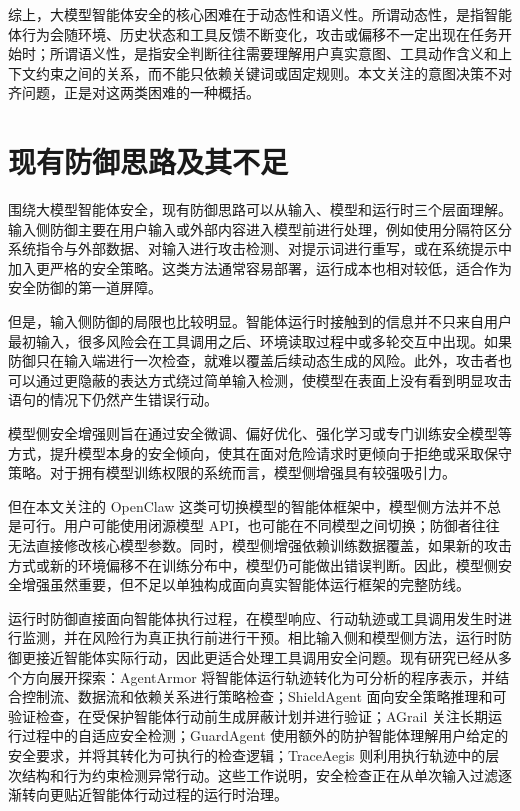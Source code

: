 综上，大模型智能体安全的核心困难在于动态性和语义性。所谓动态性，是指智能体行为会随环境、历史状态和工具反馈不断变化，攻击或偏移不一定出现在任务开始时；所谓语义性，是指安全判断往往需要理解用户真实意图、工具动作含义和上下文约束之间的关系，而不能只依赖关键词或固定规则。本文关注的意图决策不对齐问题，正是对这两类困难的一种概括。

\section{现有防御思路及其不足}

围绕大模型智能体安全，现有防御思路可以从输入、模型和运行时三个层面理解。输入侧防御主要在用户输入或外部内容进入模型前进行处理，例如使用分隔符区分系统指令与外部数据、对输入进行攻击检测、对提示词进行重写，或在系统提示中加入更严格的安全策略。这类方法通常容易部署，运行成本也相对较低，适合作为安全防御的第一道屏障。

但是，输入侧防御的局限也比较明显。智能体运行时接触到的信息并不只来自用户最初输入，很多风险会在工具调用之后、环境读取过程中或多轮交互中出现。如果防御只在输入端进行一次检查，就难以覆盖后续动态生成的风险。此外，攻击者也可以通过更隐蔽的表达方式绕过简单输入检测，使模型在表面上没有看到明显攻击语句的情况下仍然产生错误行动。

模型侧安全增强则旨在通过安全微调、偏好优化、强化学习或专门训练安全模型等方式，提升模型本身的安全倾向，使其在面对危险请求时更倾向于拒绝或采取保守策略。对于拥有模型训练权限的系统而言，模型侧增强具有较强吸引力。

但在本文关注的 OpenClaw 这类可切换模型的智能体框架中，模型侧方法并不总是可行。用户可能使用闭源模型 API，也可能在不同模型之间切换；防御者往往无法直接修改核心模型参数。同时，模型侧增强依赖训练数据覆盖，如果新的攻击方式或新的环境偏移不在训练分布中，模型仍可能做出错误判断。因此，模型侧安全增强虽然重要，但不足以单独构成面向真实智能体运行框架的完整防线。

运行时防御直接面向智能体执行过程，在模型响应、行动轨迹或工具调用发生时进行监测，并在风险行为真正执行前进行干预。相比输入侧和模型侧方法，运行时防御更接近智能体实际行动，因此更适合处理工具调用安全问题。现有研究已经从多个方向展开探索：AgentArmor 将智能体运行轨迹转化为可分析的程序表示，并结合控制流、数据流和依赖关系进行策略检查\cite{wang2025agentarmor}；ShieldAgent 面向安全策略推理和可验证检查，在受保护智能体行动前生成屏蔽计划并进行验证\cite{chen2025shieldagent}；AGrail 关注长期运行过程中的自适应安全检测\cite{luo2025agrail}；GuardAgent 使用额外的防护智能体理解用户给定的安全要求，并将其转化为可执行的检查逻辑\cite{xiang2024guardagent}；TraceAegis 则利用执行轨迹中的层次结构和行为约束检测异常行动\cite{liu2025traceaegis}。这些工作说明，安全检查正在从单次输入过滤逐渐转向更贴近智能体行动过程的运行时治理。

